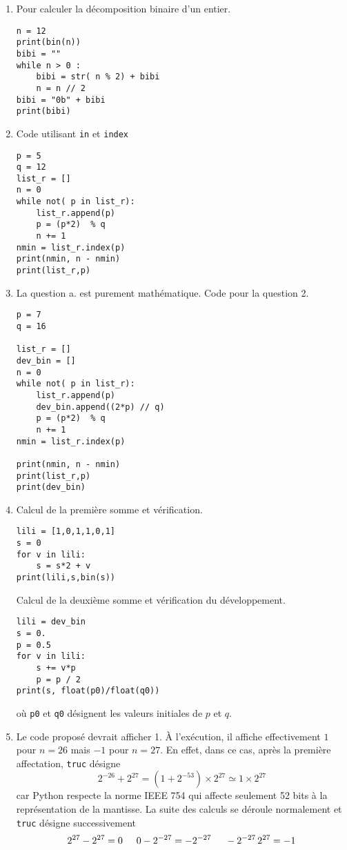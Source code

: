 \begin{enumerate}
  \item Pour calculer la décomposition binaire d'un entier.
\begin{verbatim}
n = 12
print(bin(n))
bibi = ""
while n > 0 :
    bibi = str( n % 2) + bibi
    n = n // 2
bibi = "0b" + bibi
print(bibi)
\end{verbatim}

 \item Code utilisant \texttt{in} et \texttt{index}
\begin{verbatim}p = 5
q = 12
list_r = []
n = 0
while not( p in list_r):
    list_r.append(p)
    p = (p*2)  % q
    n += 1
nmin = list_r.index(p)
print(nmin, n - nmin)
print(list_r,p)\end{verbatim}

\item La question a. est purement mathématique. Code pour la question 2.
\begin{verbatim}p = 7
q = 16

list_r = []
dev_bin = []
n = 0
while not( p in list_r):
    list_r.append(p)
    dev_bin.append((2*p) // q)
    p = (p*2)  % q
    n += 1
nmin = list_r.index(p)

print(nmin, n - nmin)
print(list_r,p)
print(dev_bin)\end{verbatim}

\item Calcul de la première somme et vérification.
\begin{verbatim}lili = [1,0,1,1,0,1]
s = 0
for v in lili:
    s = s*2 + v
print(lili,s,bin(s))\end{verbatim}


Calcul de la deuxième somme et vérification du développement.
\begin{verbatim}
lili = dev_bin
s = 0.
p = 0.5
for v in lili:
    s += v*p
    p = p / 2
print(s, float(p0)/float(q0))
\end{verbatim}
où \texttt{p0} et \texttt{q0} désignent les valeurs initiales de $p$ et $q$.

\item Le code proposé devrait afficher 1. \`A l'exécution, il affiche effectivement $1$ pour $n=26$ mais $-1$ pour $n=27$.\newline
En effet, dans ce cas, après la première affectation, \texttt{truc} désigne
\begin{displaymath}
  2^{-26} + 2^{27} = (1 + 2^{-53})\times 2^{27} \simeq 1 \times 2^{27}
\end{displaymath}
car Python respecte la norme IEEE 754 qui affecte seulement 52 bits à la représentation de la mantisse. La suite des calculs se déroule normalement et \texttt{truc} désigne successivement
\begin{displaymath}
  2^{27}-2^{27}=0\hspace{0.5cm} 0-2^{-27} = -2^{-27}
  \hspace{0.5cm} -2^{-27}\,2^{27} = -1
\end{displaymath}


\end{enumerate}
